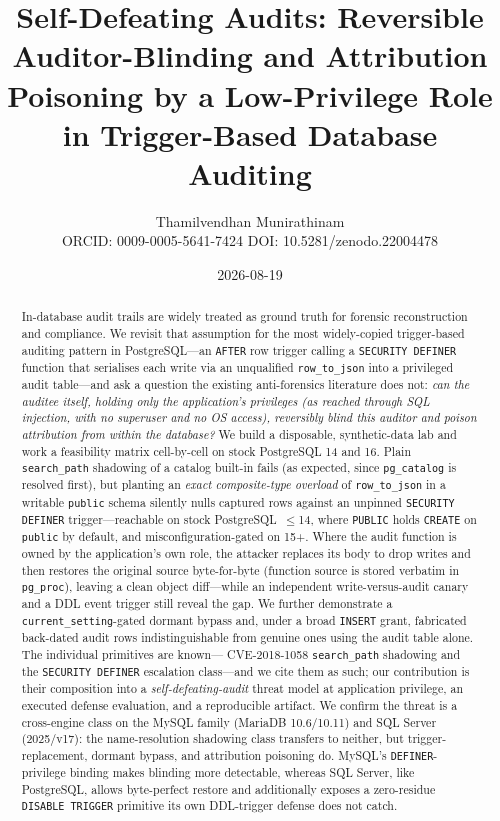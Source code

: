 \documentclass[11pt]{article}
\title{\bfseries Self-Defeating Audits: Reversible Auditor-Blinding and Attribution
Poisoning by a Low-Privilege Role in Trigger-Based Database Auditing}
\author{Thamilvendhan Munirathinam\\[2pt]
\small ORCID: 0009-0005-5641-7424 \quad DOI: 10.5281/zenodo.22004478}
\date{2026-08-19}
\newcommand{\code}[1]{\texttt{#1}}
\begin{document}
\maketitle

\begin{abstract}
In-database audit trails are widely treated as ground truth for forensic reconstruction
and compliance. We revisit that assumption for the most widely-copied trigger-based
auditing pattern in PostgreSQL---an \code{AFTER} row trigger calling a \code{SECURITY
DEFINER} function that serialises each write via an unqualified \code{row\_to\_json} into
a privileged audit table---and ask a question the existing anti-forensics literature does
not: \emph{can the auditee itself, holding only the application's privileges (as reached
through SQL injection, with no superuser and no OS access), reversibly blind this auditor
and poison attribution from within the database?} We build a disposable, synthetic-data
lab and work a feasibility matrix cell-by-cell on stock PostgreSQL 14 and 16. Plain
\code{search\_path} shadowing of a catalog built-in fails (as expected, since
\code{pg\_catalog} is resolved first), but planting an \emph{exact composite-type
overload} of \code{row\_to\_json} in a writable \code{public} schema silently nulls
captured rows against an unpinned \code{SECURITY DEFINER} trigger---reachable on stock
PostgreSQL~$\leq$14, where \code{PUBLIC} holds \code{CREATE} on \code{public} by default,
and misconfiguration-gated on 15+. Where the audit function is owned by the application's
own role, the attacker replaces its body to drop writes and then restores the original
source byte-for-byte (function source is stored verbatim in \code{pg\_proc}), leaving a
clean object diff---while an independent write-versus-audit canary and a DDL event trigger
still reveal the gap. We further demonstrate a \code{current\_setting}-gated dormant bypass
and, under a broad \code{INSERT} grant, fabricated back-dated audit rows indistinguishable
from genuine ones using the audit table alone. The individual primitives are known---%
CVE-2018-1058 \code{search\_path} shadowing and the \code{SECURITY DEFINER} escalation
class---and we cite them as such; our contribution is their composition into a
\emph{self-defeating-audit} threat model at application privilege, an executed defense
evaluation, and a reproducible artifact. We confirm the threat is a cross-engine class on
the MySQL family (MariaDB 10.6/10.11) and SQL Server (2025/v17): the name-resolution
shadowing class transfers to neither, but trigger-replacement, dormant bypass, and
attribution poisoning do. MySQL's \code{DEFINER}-privilege binding makes blinding more
detectable, whereas SQL Server, like PostgreSQL, allows byte-perfect restore and
additionally exposes a zero-residue \code{DISABLE TRIGGER} primitive its own DDL-trigger
defense does not catch.
\end{abstract}
\end{document}
